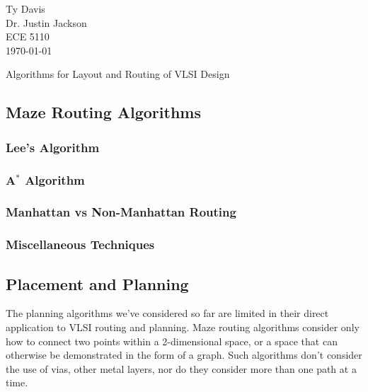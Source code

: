 \documentclass[12pt]{article}
\begin{document}
\begin{flushleft}

Ty Davis\\
Dr. Justin Jackson\\
ECE 5110\\
\today \\


\begin{center}
  Algorithms for Layout and Routing of VLSI Design
\end{center}



\setlength{\parindent}{0.5in}



\subsection*{Maze Routing Algorithms}

\subsubsection*{Lee's Algorithm}


\subsubsection*{A$^*$ Algorithm}


\subsubsection*{Manhattan vs Non-Manhattan Routing}


\subsubsection*{Miscellaneous Techniques}


\subsection*{Placement and Planning}

The planning algorithms we've considered so far are
limited in their direct application to VLSI routing
and planning. Maze routing algorithms consider only
how to connect two points within a 2-dimensional space,
or a space that can otherwise be demonstrated in the
form of a graph. Such algorithms don't consider the
use of vias, other metal layers, nor do they consider
more than one path at a time.


\end{flushleft}
\end{document}

